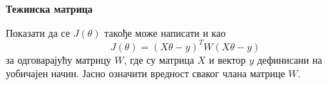 \item {} {\bf Тежинска матрица}

Показати да се $J(\theta)$ такође може написати и као
\begin{equation*}
 J(\theta)=(X\theta-y)^TW(X\theta-y)
\end{equation*}
за одговарајућу матрицу $W$, где су матрица $X$ и вектор $y$ дефинисани на уобичајен начин. Јасно означити вредност сваког члана матрице $W$.


